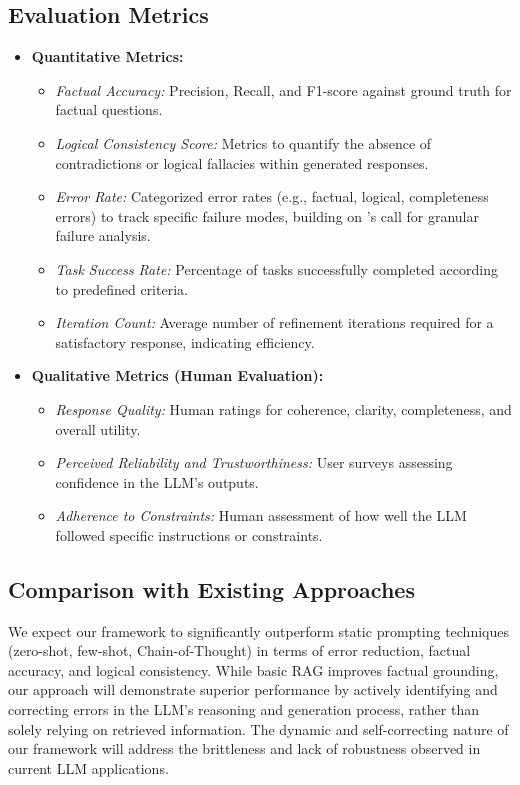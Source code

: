 \documentclass{article}
\begin{document}
\subsection{Evaluation Metrics}
\begin{itemize}
    \item \textbf{Quantitative Metrics:}
    \begin{itemize}
        \item \textit{Factual Accuracy:} Precision, Recall, and F1-score against ground truth for factual questions.
        \item \textit{Logical Consistency Score:} Metrics to quantify the absence of contradictions or logical fallacies within generated responses.
        \item \textit{Error Rate:} Categorized error rates (e.g., factual, logical, completeness errors) to track specific failure modes, building on \cite{P1}'s call for granular failure analysis.
        \item \textit{Task Success Rate:} Percentage of tasks successfully completed according to predefined criteria.
        \item \textit{Iteration Count:} Average number of refinement iterations required for a satisfactory response, indicating efficiency.
    \end{itemize}
    \item \textbf{Qualitative Metrics (Human Evaluation):}
    \begin{itemize}
        \item \textit{Response Quality:} Human ratings for coherence, clarity, completeness, and overall utility.
        \item \textit{Perceived Reliability and Trustworthiness:} User surveys assessing confidence in the LLM's outputs.
        \item \textit{Adherence to Constraints:} Human assessment of how well the LLM followed specific instructions or constraints.
    \end{itemize}
\end{itemize}

\subsection{Comparison with Existing Approaches}
We expect our framework to significantly outperform static prompting techniques (zero-shot, few-shot, Chain-of-Thought) in terms of error reduction, factual accuracy, and logical consistency. While basic RAG improves factual grounding, our approach will demonstrate superior performance by actively identifying and correcting errors in the LLM's reasoning and generation process, rather than solely relying on retrieved information. The dynamic and self-correcting nature of our framework will address the brittleness and lack of robustness observed in current LLM applications.
\end{document}
